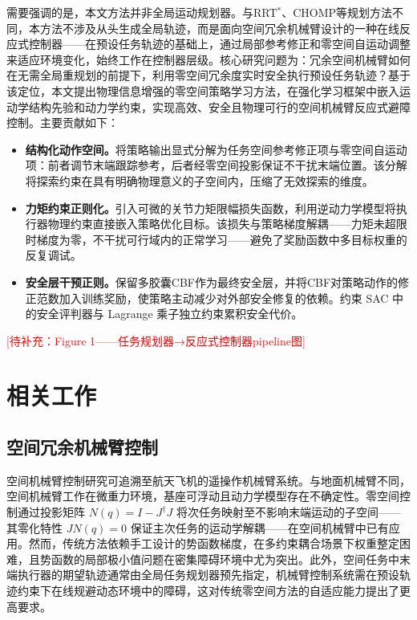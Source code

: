 \documentclass[10pt,conference]{IEEEtran}
\begin{document}
需要强调的是，本文方法并非全局运动规划器。与RRT$^*$、CHOMP等规划方法不同，本方法不涉及从头生成全局轨迹，而是面向空间冗余机械臂设计的一种在线反应式控制器——在预设任务轨迹的基础上，通过局部参考修正和零空间自运动调整来适应环境变化，始终工作在控制器层级。核心研究问题为：冗余空间机械臂如何在无需全局重规划的前提下，利用零空间冗余度实时安全执行预设任务轨迹？基于该定位，本文提出物理信息增强的零空间策略学习方法，在强化学习框架中嵌入运动学结构先验和动力学约束，实现高效、安全且物理可行的空间机械臂反应式避障控制。主要贡献如下：

\begin{itemize}
\item \textbf{结构化动作空间。}将策略输出显式分解为任务空间参考修正项与零空间自运动项：前者调节末端跟踪参考，后者经零空间投影保证不干扰末端位置。该分解将探索约束在具有明确物理意义的子空间内，压缩了无效探索的维度。

\item \textbf{力矩约束正则化。}引入可微的关节力矩限幅损失函数，利用逆动力学模型将执行器物理约束直接嵌入策略优化目标。该损失与策略梯度解耦——力矩未超限时梯度为零，不干扰可行域内的正常学习——避免了奖励函数中多目标权重的反复调试。

\item \textbf{安全层干预正则。}保留多胶囊CBF作为最终安全层，并将CBF对策略动作的修正范数加入训练奖励，使策略主动减少对外部安全修复的依赖。约束 SAC 中的安全评判器与 Lagrange 乘子独立约束累积安全代价。
\end{itemize}

\textcolor{red}{[待补充：Figure 1——任务规划器→反应式控制器pipeline图]}

\section{相关工作}

\subsection{空间冗余机械臂控制}
空间机械臂控制研究可追溯至航天飞机的遥操作机械臂系统。与地面机械臂不同，空间机械臂工作在微重力环境，基座可浮动且动力学模型存在不确定性\cite{yoshida2009space}。零空间控制通过投影矩阵 $N(q) = I - J^\dagger J$ 将次任务映射至不影响末端运动的子空间——其零化特性 $J N(q) = 0$ 保证主次任务的运动学解耦——在空间机械臂中已有应用\cite{flacco2012motion, chiaverini1997review}。然而，传统方法依赖手工设计的势函数梯度，在多约束耦合场景下权重整定困难，且势函数的局部极小值问题在密集障碍环境中尤为突出。此外，空间任务中末端执行器的期望轨迹通常由全局任务规划器预先指定，机械臂控制系统需在预设轨迹约束下在线规避动态环境中的障碍，这对传统零空间方法的自适应能力提出了更高要求。
\end{document}
